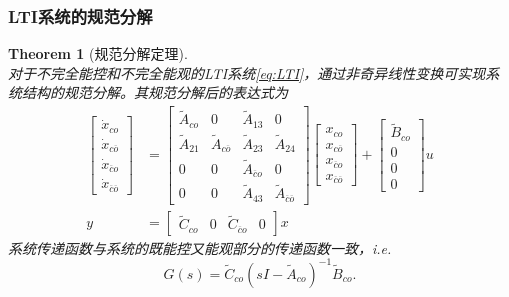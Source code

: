 \documentclass[14pt,a4paper]{article}
\theoremstyle{plain}
\newtheorem{thm}{Theorem}[section]
\theoremstyle{definition}
\theoremstyle{remark}
\theoremstyle{plain}
\theoremstyle{plain}
\theoremstyle{plain}
\theoremstyle{definition}
\theoremstyle{remark}
\numberwithin{equation}{section}
\begin{document}
			\subsubsection{LTI系统的规范分解}%
			\label{ssub:lti系统的规范分解}
			
				\begin{thm}[规范分解定理]  
				\label{the:规范分解定理}
				\ \\
				对于不完全能控和不完全能观的LTI系统\eqref{eq:LTI}，通过非奇异线性变换可实现系统结构的规范分解。其规范分解后的表达式为
				\begin{equation}
				\label{eq:canonical_decmp}
				\begin{aligned}
					\begin{bmatrix}
						\dot x_{co} \\ 
						\dot x_{c\overline{o}}\\
						\dot x_{\overline{c}o}\\
						\dot x_{\overline{c}\overline{o}}
					\end{bmatrix} &= \begin{bmatrix}
					\tilde A_{co} & 0 & \tilde A_{13} & 0\\ 
					\tilde A_{21} & \tilde A_{c\overline{o}} & \tilde A_{23} & \tilde A_{24} \\ 
					0 & 0& \tilde A_{\overline{c}o} & 0\\ 
					0 & 0& \tilde A_{43} & \tilde A_{\overline{c}\overline{o}}
					\end{bmatrix} \begin{bmatrix}
						 x_{co} \\ 
						 x_{c\overline{o}}\\
						 x_{\overline{c}o}\\
						 x_{\overline{c}\overline{o}}
					\end{bmatrix} + \begin{bmatrix}
						\tilde B_{co} \\ 0 \\ 0\\ 0 
					\end{bmatrix} u \\
					y&= \begin{bmatrix}
						\tilde C_{co} & 0 & \tilde C_{\overline{c}o} & 0 
					\end{bmatrix} x
				\end{aligned}  
				\end{equation} 
				系统传递函数与系统的既能控又能观部分的传递函数一致，i.e. 
				\[
					G(s) = \tilde C_{co}\left( sI - \tilde A_{co} \right) ^{-1} \tilde B_{co}
				.\] 
				\end{thm} 
\end{document}

